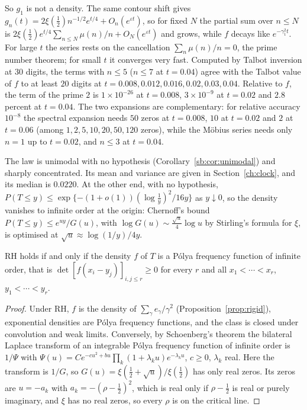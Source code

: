 So $g_1$ is not a density. The same contour shift gives $g_n(t)=2\xi(\frac12)n^{-1/2}e^{t/4}+O_n(e^{\varepsilon t})$, so for fixed $N$ the partial sum over $n\le N$ is $2\xi(\frac12)e^{t/4}\sum_{n\le N}\mu(n)/n+O_N(e^{\varepsilon t})$ and grows, while $f$ decays like $e^{-\gamma_1^2t}$. For large $t$ the series rests on the cancellation $\sum_n\mu(n)/n=0$, the prime number theorem; for small $t$ it converges very fast. Computed by Talbot inversion at $30$ digits, the terms with $n\le5$ ($n\le7$ at $t=0.04$) agree with the Talbot value of $f$ to at least $20$ digits at $t=0.008,0.012,0.016,0.02,0.03,0.04$. Relative to $f$, the term of the prime $2$ is $1\times10^{-26}$ at $t=0.008$, $3\times10^{-9}$ at $t=0.02$ and $2.8$ percent at $t=0.04$. The two expansions are complementary: for relative accuracy $10^{-8}$ the spectral expansion needs $50$ zeros at $t=0.008$, $10$ at $t=0.02$ and $2$ at $t=0.06$ (among $1,2,5,10,20,50,120$ zeros), while the M\"obius series needs only $n=1$ up to $t=0.02$, and $n\le3$ at $t=0.04$.


\begin{resultpar}
The law is unimodal with no hypothesis (Corollary~\ref{sb:cor:unimodal}) and sharply concentrated. Its mean and variance are given in Section~\ref{ch:clock}, and its median is $0.0220$. At the other end, with no hypothesis, $P(T\le y)\le\exp\{-(1+o(1))(\log\frac1y)^2/16y\}$ as $y\downarrow0$, so the density vanishes to infinite order at the origin: Chernoff's bound $P(T\le y)\le e^{uy}/G(u)$, with $\log G(u)\sim\frac{\sqrt u}4\log u$ by Stirling's formula for $\xi$, is optimised at $\sqrt u\approx\log(1/y)/4y$.\label{tx3:res:lowertail}
\end{resultpar}

\begin{proposition}\label{tx2:prop:pf}
RH holds if and only if the density $f$ of $T$ is a P\'olya frequency function of infinite order, that is $\det[f(x_i-y_j)]_{i,j\le r}\ge0$ for every $r$ and all $x_1<\cdots<x_r$, $y_1<\cdots<y_r$.
\end{proposition}

\begin{proof}
Under RH, $f$ is the density of $\sum_\gamma e_\gamma/\gamma^2$ (Proposition~\ref{prop:rigid}), exponential densities are P\'olya frequency functions, and the class is closed under convolution and weak limits. Conversely, by Schoenberg's theorem \cite{Schoenberg51} the bilateral Laplace transform of an integrable P\'olya frequency function of infinite order is $1/\Psi$ with $\Psi(u)=Ce^{-cu^2+bu}\prod_k(1+\lambda_ku)e^{-\lambda_ku}$, $c\ge0$, $\lambda_k$ real. Here the transform is $1/G$, so $G(u)=\xi(\frac12+\sqrt u)/\xi(\frac12)$ has only real zeros. Its zeros are $u=-a_k$ with $a_k=-(\rho-\frac12)^2$, which is real only if $\rho-\frac12$ is real or purely imaginary, and $\xi$ has no real zeros, so every $\rho$ is on the critical line.
\end{proof}

